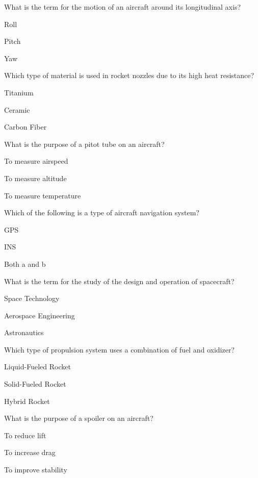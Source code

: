 \begin{enhancedmcq}{What is the term for the motion of an aircraft around its longitudinal axis?}
\item Roll
\item Pitch
\item Yaw

\end{enhancedmcq}
\begin{enhancedmcq}{Which type of material is used in rocket nozzles due to its high heat resistance?}
\item Titanium
\item Ceramic
\item Carbon Fiber

\end{enhancedmcq}
\begin{enhancedmcq}{What is the purpose of a pitot tube on an aircraft?}
\item To measure airspeed
\item To measure altitude
\item To measure temperature

\end{enhancedmcq}
\begin{enhancedmcq}{Which of the following is a type of aircraft navigation system?}
\item GPS
\item INS
\item Both a and b

\end{enhancedmcq}
\begin{enhancedmcq}{What is the term for the study of the design and operation of spacecraft?}
\item Space Technology
\item Aerospace Engineering
\item Astronautics

\end{enhancedmcq}
\begin{enhancedmcq}{Which type of propulsion system uses a combination of fuel and oxidizer?}
\item Liquid-Fueled Rocket
\item Solid-Fueled Rocket
\item Hybrid Rocket

\end{enhancedmcq}
\begin{enhancedmcq}{What is the purpose of a spoiler on an aircraft?}
\item To reduce lift
\item To increase drag
\item To improve stability

\end{enhancedmcq}

